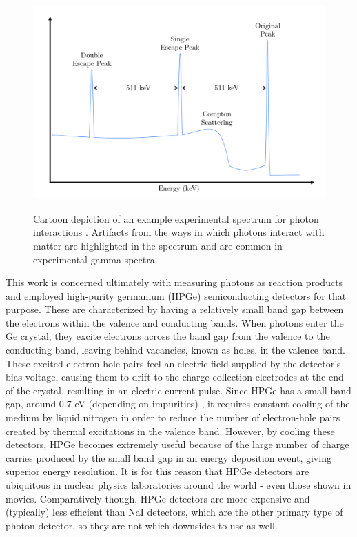 \begin{figure}
\includegraphics[width=\linewidth]{figures/photonSpectrum.png}
\label{fig: gammaSpec}
\caption{Cartoon depiction of an example experimental spectrum for photon interactions \cite{Hall2018}. Artifacts from the ways in which photons interact with matter are highlighted in the spectrum and are common in experimental gamma spectra.   }
\end{figure}


This work is concerned ultimately with measuring photons as reaction products and employed high-purity germanium (HPGe) semiconducting detectors for that purpose. These are characterized by having a relatively small band gap between the electrons within the valence and conducting bands. When photons enter the Ge crystal, they excite electrons across the band gap from the valence to the conducting band, leaving behind vacancies, known as holes, in the valence band. These excited electron-hole pairs feel an electric field supplied by the detector's bias voltage, causing them to drift to the charge collection electrodes at the end of the crystal, resulting in an electric current pulse. Since HPGe has a small band gap, around 0.7 eV (depending on impurities) \cite{KnollBook}, it requires constant cooling of the medium by liquid nitrogen in order to reduce the number of electron-hole pairs created by thermal excitations in the valence band. However, by cooling these detectors, HPGe becomes extremely useful because of the large number of charge carries produced by the small band gap in an energy deposition event, giving superior energy resolution. It is for this reason that HPGe detectors are ubiquitous in nuclear physics laboratories around the world - even those shown in movies. Comparatively though, HPGe detectors are more expensive and (typically) less efficient than NaI detectors, which are the other primary type of photon detector, so they are not which downsides to use as well. 

